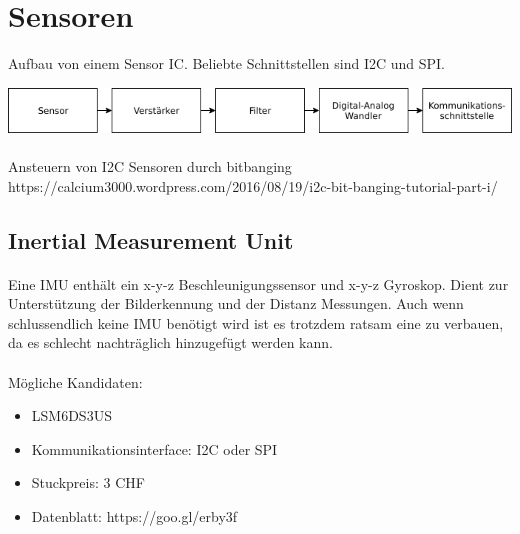 \documentclass[a4paper]{report}
\begin{document}
\vspace{1em}
\noindent

\section{Sensoren}
Aufbau von einem Sensor IC. Beliebte Schnittstellen sind I2C und SPI.

\includegraphics[width=\textwidth,keepaspectratio]{daq}

\paragraph{} Ansteuern von I2C Sensoren durch bitbanging
https://calcium3000.wordpress.com/2016/08/19/i2c-bit-banging-tutorial-part-i/

\subsection{Inertial Measurement Unit}
\paragraph{} Eine IMU enthält ein x-y-z Beschleunigungssensor und x-y-z
Gyroskop. Dient zur Unterstützung der Bilderkennung und der Distanz
Messungen. Auch wenn schlussendlich keine IMU benötigt wird ist es trotzdem
ratsam eine zu verbauen, da es schlecht nachträglich hinzugefügt werden kann.

\paragraph{} Mögliche Kandidaten:
\begin{itemize}
\item LSM6DS3US
\item Kommunikationsinterface: I2C oder SPI
\item Stuckpreis: 3 CHF
\item Datenblatt: https://goo.gl/erby3f
\end{itemize}
\end{document}
